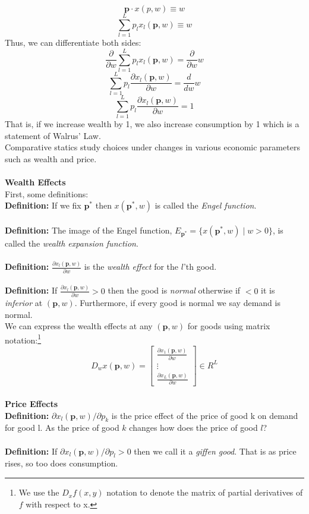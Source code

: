 \documentclass[12pt]{article}
\let\bf\oldbf
\let\bf\textbf
\begin{document}
$$\bf{p}\cdot x(p,w) \equiv w$$
$$\sum^L_{l=1}p_lx_l(\bf{p}, w) \equiv w$$
Thus, we can differentiate both sides:
$$\frac{\partial}{\partial w}\sum^L_{l=1}p_lx_l(\bf{p}, w) = \frac{\partial}{\partial w}w$$
$$\sum^L_{l=1}p_l\frac{\partial x_l(\bf{p}, w)}{\partial w} = \frac{d}{dw}w$$
$$\sum^L_{l=1}p_l\frac{\partial x_l(\bf{p}, w)}{\partial w} = 1$$
That is, if we increase wealth by 1, we also increase consumption by 1 which is a statement of Walrus' Law.
\vspace{10pt}
\\Comparative statics study choices under changes in various economic parameters such as wealth and price.
\\\bf{\\Wealth Effects}
\\ First, some definitions:
\\ \bf{Definition:} If we fix $\bf{p}^*$ then $x(\bf{p}^*, w)$ is called the \emph{Engel function}.
\\ \bf{\\Definition:} The image of the Engel function, $E_{\bf{p}^*} = \{x(\bf{p}^*,w) \; | \; w > 0\}$, is called the \emph{wealth expansion function}.
\\ \bf{\\Definition:} $\frac{\partial x_l(\bf{p},w)}{\partial w}$ is the \emph{wealth effect} for the $l$'th good.
\\ \bf{\\Definition:} If $\frac{\partial x_l(\bf{p},w)}{\partial w} > 0$ then the good is \emph{normal} otherwise if $< 0$ it is \emph{inferior} at $(\bf{p}, w)$. Furthermore, if every good is normal we say demand is normal.
\\ We can express the wealth effects at any $(\bf{p}, w)$ for goods using matrix notation:\footnote{We use the $D_xf(x,y)$ notation to denote the matrix of partial derivatives of $f$ with respect to x.}
$$D_wx(\bf{p}, w) = \begin{bmatrix} 
\frac{\partial x_1(\bf{p},w)}{\partial w} \\
\vdots \\
\frac{\partial x_L(\bf{p},w)}{\partial w} 
\end{bmatrix} \in R^L$$
\\ \bf{Price Effects}
\\ \bf{Definition:} $\partial x_l(\bf{p}, w)/\partial p_k$ is the price effect of the price of good k on demand for good l. As the price of good $k$ changes how does the price of good $l$?
\\ \bf{\\Definition:} If $\partial x_l(\bf{p}, w)/\partial p_l > 0$ then we call it a \emph{giffen good}. That is as price rises, so too does consumption.
\end{document}
